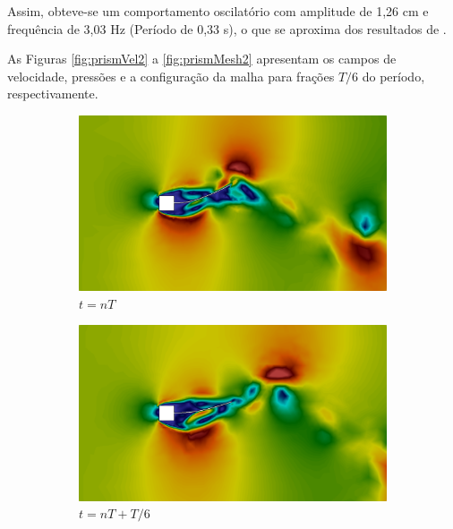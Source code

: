 Assim, obteve-se um comportamento oscilatório com amplitude de 1,26 cm e frequência de 3,03 Hz (Período de 0,33 s), o que se aproxima dos resultados de .

As Figuras \ref{fig:prismVel2} a \ref{fig:prismMesh2} apresentam os campos de velocidade, pressões e a configuração da malha para frações $T/6$ do período, respectivamente.

\begin{figure}[h!]
    \centering
    \caption{\textit{Flutter} em painel - Campo de magnitude de velocidade obtidos no problema de \textit{Flutter} em painel.}
    \begin{subfigure}[b]{0.32\textwidth}
        \includegraphics[width=\linewidth]{Figuras/FSI-prism2/vT1.png}
        \caption{$t=nT$}
    \end{subfigure}
    \begin{subfigure}[b]{0.32\textwidth}
        \includegraphics[width=\linewidth]{Figuras/FSI-prism2/vT2.png}
        \caption{$t=nT+T/6$}
    \end{subfigure}
    \begin{subfigure}[b]{0.32\textwidth}

\end{subfigure}
\end{figure}
